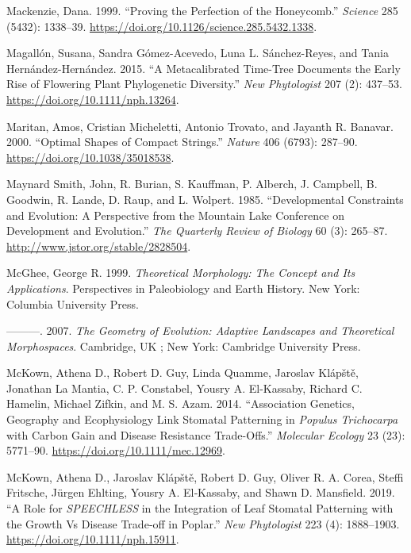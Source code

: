\documentclass[
  12pt,
]{article}
\newlength{\cslhangindent}
\newlength{\cslentryspacingunit} %
\newenvironment{CSLReferences}[2] %
 {%
  \setlength{\parindent}{0pt}
  \ifodd #1
  \let\oldpar\par
  \def\par{\hangindent=\cslhangindent\oldpar}
  \fi
  \setlength{\parskip}{#2\cslentryspacingunit}
 }%
 {}
\begin{document}
\begin{CSLReferences}{1}{0}
\leavevmode{}%
Mackenzie, Dana. 1999. {``Proving the {Perfection} of the {Honeycomb}.''} \emph{Science} 285 (5432): 1338--39. \url{https://doi.org/10.1126/science.285.5432.1338}.

\leavevmode{}%
Magallón, Susana, Sandra Gómez-Acevedo, Luna L. Sánchez-Reyes, and Tania Hernández-Hernández. 2015. {``A Metacalibrated Time-Tree Documents the Early Rise of Flowering Plant Phylogenetic Diversity.''} \emph{New Phytologist} 207 (2): 437--53. \url{https://doi.org/10.1111/nph.13264}.

\leavevmode{}%
Maritan, Amos, Cristian Micheletti, Antonio Trovato, and Jayanth R. Banavar. 2000. {``Optimal Shapes of Compact Strings.''} \emph{Nature} 406 (6793): 287--90. \url{https://doi.org/10.1038/35018538}.

\leavevmode{}%
Maynard Smith, John, R. Burian, S. Kauffman, P. Alberch, J. Campbell, B. Goodwin, R. Lande, D. Raup, and L. Wolpert. 1985. {``Developmental {Constraints} and {Evolution}: {A} {Perspective} from the {Mountain} {Lake} {Conference} on {Development} and {Evolution}.''} \emph{The Quarterly Review of Biology} 60 (3): 265--87. \url{http://www.jstor.org/stable/2828504}.

\leavevmode{}%
McGhee, George R. 1999. \emph{Theoretical Morphology: The Concept and Its Applications}. Perspectives in Paleobiology and Earth History. New York: Columbia University Press.

\leavevmode{}%
---------. 2007. \emph{The Geometry of Evolution: Adaptive Landscapes and Theoretical Morphospaces}. Cambridge, UK ; New York: Cambridge University Press.

\leavevmode{}%
McKown, Athena D., Robert D. Guy, Linda Quamme, Jaroslav Klápště, Jonathan La Mantia, C. P. Constabel, Yousry A. El-Kassaby, Richard C. Hamelin, Michael Zifkin, and M. S. Azam. 2014. {``Association Genetics, Geography and Ecophysiology Link Stomatal Patterning in \emph{{Populus} Trichocarpa} with Carbon Gain and Disease Resistance Trade-Offs.''} \emph{Molecular Ecology} 23 (23): 5771--90. \url{https://doi.org/10.1111/mec.12969}.

\leavevmode{}%
McKown, Athena D., Jaroslav Klápště, Robert D. Guy, Oliver R. A. Corea, Steffi Fritsche, Jürgen Ehlting, Yousry A. El‐Kassaby, and Shawn D. Mansfield. 2019. {``A Role for \emph{SPEECHLESS} in the Integration of Leaf Stomatal Patterning with the Growth Vs Disease Trade‐off in Poplar.''} \emph{New Phytologist} 223 (4): 1888--1903. \url{https://doi.org/10.1111/nph.15911}.


\end{CSLReferences}
\end{document}
